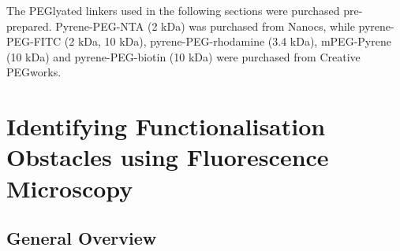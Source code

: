\documentclass[
  a4paper,
]{scrbook}
\begin{document}
The PEGlyated linkers used in the following sections were purchased
pre-prepared. Pyrene-PEG-NTA (2 kDa) was purchased from Nanocs, while
pyrene-PEG-FITC (2 kDa, 10 kDa), pyrene-PEG-rhodamine (3.4 kDa),
mPEG-Pyrene (10 kDa) and pyrene-PEG-biotin (10 kDa) were purchased from
Creative PEGworks.

\hypertarget{sec-impediments}{%
\section{Identifying Functionalisation Obstacles using Fluorescence
Microscopy}\label{sec-impediments}}

\hypertarget{sec-fluorescence-remarks}{%
\subsection{General Overview}\label{sec-fluorescence-remarks}}
\end{document}

